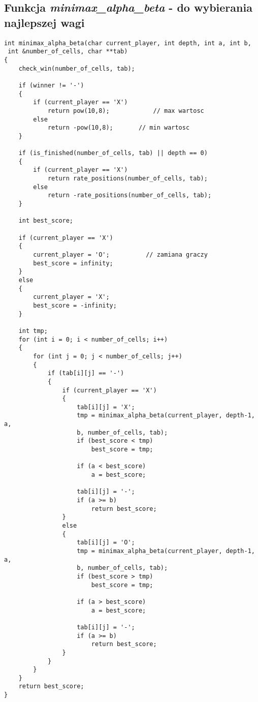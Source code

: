 \documentclass[12pt]{article}
\begin{document}
\subsection{Funkcja \textit{minimax\_alpha\_beta} - do wybierania najlepszej wagi}

\begin{lstlisting}
int minimax_alpha_beta(char current_player, int depth, int a, int b,
 int &number_of_cells, char **tab)
{
    check_win(number_of_cells, tab);

    if (winner != '-')                
    {
        if (current_player == 'X')      
            return pow(10,8);            // max wartosc
        else
            return -pow(10,8);       // min wartosc
    }

    if (is_finished(number_of_cells, tab) || depth == 0)
    {
        if (current_player == 'X')
            return rate_positions(number_of_cells, tab);    
        else
            return -rate_positions(number_of_cells, tab);
    }

    int best_score;

    if (current_player == 'X')
    {
        current_player = 'O';          // zamiana graczy
        best_score = infinity;
    }
    else
    {
        current_player = 'X';
        best_score = -infinity;
    }

    int tmp;
    for (int i = 0; i < number_of_cells; i++)
    {
        for (int j = 0; j < number_of_cells; j++)
        {
            if (tab[i][j] == '-')
            {
                if (current_player == 'X')
                {
                    tab[i][j] = 'X';
                    tmp = minimax_alpha_beta(current_player, depth-1, a, 
                    b, number_of_cells, tab);
                    if (best_score < tmp)
                        best_score = tmp;
                    
                    if (a < best_score)
                        a = best_score;

                    tab[i][j] = '-';
                    if (a >= b)
                        return best_score;
                }
                else
                {
                    tab[i][j] = 'O';
                    tmp = minimax_alpha_beta(current_player, depth-1, a, 
                    b, number_of_cells, tab);
                    if (best_score > tmp)
                        best_score = tmp;
                    
                    if (a > best_score)
                        a = best_score;

                    tab[i][j] = '-';
                    if (a >= b)
                        return best_score;
                }
            }
        }
    }
    return best_score;
}
\end{lstlisting}
\end{document}
